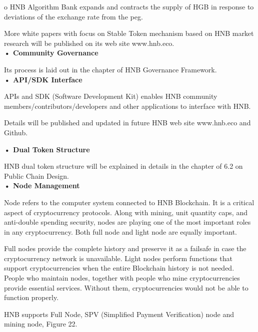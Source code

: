 \documentclass[fleqn,10pt]{SelfArx} %
\begin{document}
o	HNB Algorithm Bank expands and contracts the supply of HGB in response to deviations of the exchange rate from the peg.

More white papers with focus on Stable Token mechanism based on HNB market research will be published on its web site www.hnb.eco.  \\

\textbf {•	Community Governance}

Its process is laid out in the chapter of HNB Governance Framework. \\

\textbf {•	API/SDK Interface}

APIs and SDK (Software Development Kit) enables HNB community members/contributors/developers and other applications to interface with HNB.

Details will be published and updated in future HNB web site www.hnb.eco and Github. \\



\textbf {•	Dual Token Structure}

HNB dual token structure will be explained in details in the chapter of 6.2 on Public Chain Design. \\

\textbf {•	Node Management}

Node refers to the computer system connected to HNB Blockchain. It is a critical aspect of cryptocurrency protocols. Along with mining, unit quantity caps, and anti-double spending security, nodes are playing one of the most important roles in any cryptocurrency. Both full node and light node are equally important. 

Full nodes provide the complete history and preserve it as a failsafe in case the cryptocurrency network is unavailable. Light nodes perform functions that support cryptocurrencies when the entire Blockchain history is not needed. People who maintain nodes, together with people who mine cryptocurrencies provide essential services. Without them, cryptocurrencies would not be able to function properly.

HNB supports Full Node, SPV (Simplified Payment Verification) node and mining node, Figure 22. \\
\end{document}
